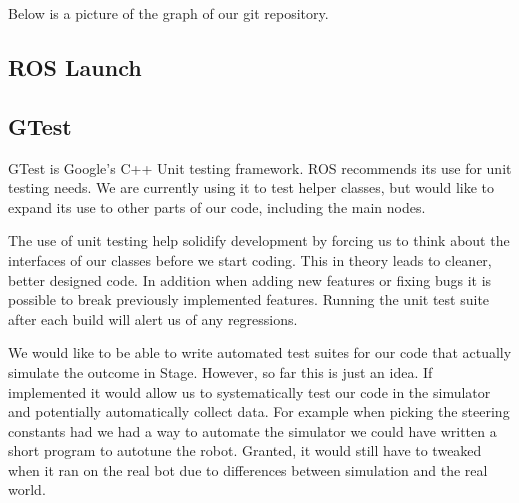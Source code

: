 Below is a picture of the graph of our git repository.

\subsection{ROS Launch}



\subsection{GTest}

GTest is Google's C++ Unit testing
framework.\cite{google_googletest} ROS recommends
its use for unit testing needs.  We are currently using it to test
helper classes, but would like to expand its use to other parts of our
code, including the main nodes.

The use of unit testing help solidify development by forcing us to
think about the interfaces of our classes before we start coding.
This in theory leads to cleaner, better designed code.  In addition
when adding new features or fixing bugs it is possible to break
previously implemented features.  Running the unit test suite after
each build will alert us of any regressions.

We would like to be able to write automated test suites for our code
that actually simulate the outcome in Stage. However, so far this is
just an idea.  If implemented it would allow us to systematically test
our code in the simulator and potentially automatically collect data.
For example when picking the steering constants had we had a way to
automate the simulator we could have written a short program to
autotune the robot.  Granted, it would still have to tweaked when it
ran on the real bot due to differences between simulation and the real world.